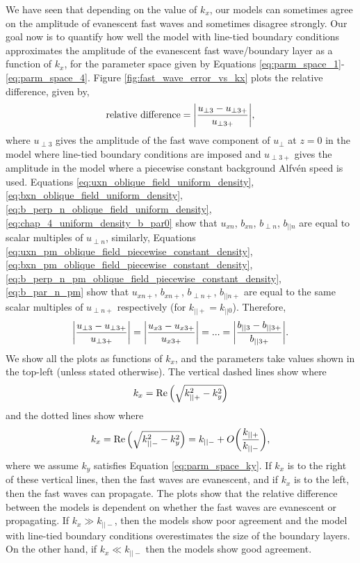 We have seen that depending on the value of $k_x$, our models can sometimes agree on the amplitude of evanescent fast waves and sometimes disagree strongly. Our goal now is to quantify how well the model with line-tied boundary conditions approximates the amplitude of the evanescent fast wave/boundary layer as a function of $k_x$, for the parameter space given by Equations \eqref{eq:parm_space_1}-\eqref{eq:parm_space_4}. Figure \ref{fig:fast_wave_error_vs_kx} plots the relative difference, given by,
\begin{equation}
    \label{eq:relative_difference}
    \text{relative difference} = \abs{\frac{u_{\perp3} - u_{\perp 3+}}{u_{\perp 3+}}},
\end{equation}
where $u_{\perp3}$ gives the amplitude of the fast wave component of $u_\perp$ at $z=0$ in the model where line-tied boundary conditions are imposed and $u_{\perp 3+}$ gives the amplitude in the model where a piecewise constant background Alfv\'en speed is used. Equations \eqref{eq:uxn_oblique_field_uniform_density}, \eqref{eq:bxn_oblique_field_uniform_density}, \eqref{eq:b_perp_n_oblique_field_uniform_density}, \eqref{eq:chap_4_uniform_density_b_par0} show that $u_{xn}$, $b_{xn}$, $b_{\perp n}$, $b_{|| n}$ are equal to scalar multiples of $u_{\perp n}$, similarly, Equations \eqref{eq:uxn_pm_oblique_field_piecewise_constant_density}, \eqref{eq:bxn_pm_oblique_field_piecewise_constant_density}, \eqref{eq:b_perp_n_pm_oblique_field_piecewise_constant_density}, \eqref{eq:b_par_n_pm} show that $u_{xn+}$, $b_{xn+}$, $b_{\perp n+}$, $b_{|| n+}$ are equal to the same scalar multiples of $u_{\perp n+}$ respectively (for $k_{||+}=k_{||0}$). Therefore,
\begin{equation}
    \abs{\frac{u_{\perp3} - u_{\perp 3+}}{u_{\perp 3+}}} = \abs{\frac{u_{x3} - u_{x 3+}}{u_{x 3+}}} = ... = \abs{\frac{b_{||3} - b_{|| 3+}}{b_{|| 3+}}}.
\end{equation}
We show all the plots as functions of $k_x$, and the parameters take values shown in the top-left (unless stated otherwise). The vertical dashed lines show where 
\[k_x = \Re\qty(\sqrt{k_{||+}^2-k_y^2})\] 
and the dotted lines show where 
\[k_x = \Re\qty(\sqrt{k_{||-}^2-k_y^2})= k_{||-} + O\qty(\frac{k_{||+}}{k_{||-}}),\]
where we assume $k_y$ satisfies Equation \eqref{eq:parm_space_ky}.
If $k_x$ is to the right of these vertical lines, then the fast waves are evanescent, and if $k_x$ is to the left, then the fast waves can propagate. The plots show that the relative difference between the models is dependent on whether the fast waves are evanescent or propagating. If $k_x \gg k_{||-}$, then the models show poor agreement and the model with line-tied boundary conditions overestimates the size of the boundary layers. On the other hand, if $k_x \ll k_{||-}$
then the models show good agreement.

